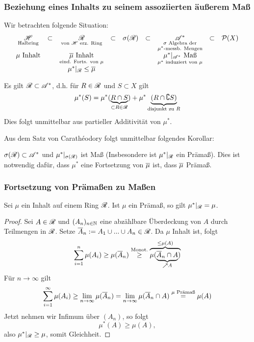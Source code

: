 \subsubsection{Beziehung eines Inhalts zu seinem assoziierten äußerem Maß}
Wir betrachten folgende Situation:
\begin{equation*}
\begin{array}{ccccccccc}
\underset{\text{Halbring}}{\mathscr{H}} & \subset & \underset{\text{von } \mathscr{H} \text{ erz. Ring}}{\mathscr{R}} & \subset &\sigma(\mathscr{R})& \subset & \underset{\substack{\sigma \text{ Algebra der} \\ \mu^*\text{-messb. Mengen}}}{\mathscr{A}^*} & \subset & \mathcal{P}(X)\\
\mu \text{ Inhalt} && \underset{\text{eind. Forts. von }\mu}{\overline\mu \text{ Inhalt}} &&&& \underset{\mu^* \text{ induziert von } \mu}{\mu^*|_{\mathscr{A}^*} \text{ Maß}} \\
&& \mu^*|_{\mathscr{R}} \leq \overline\mu
\end{array}
\end{equation*}
\begin{beobachtung}
Es gilt $\mathscr{R} \subset \mathscr{A}^*$, d.h. für $R \in \mathscr{R}$ und $S \subset X$ gilt
$$
\mu^*(S) = \mu^*(\underbrace{R \cap S}_{\subset R \in \mathscr{R}}) + \mu^* \underbrace{(R \cap \complement S)}_{\text{disjunkt zu } R}
$$
Dies folgt unmittelbar aus partieller Additivität von $\mu^*$.
\end{beobachtung}
Aus dem Satz von Carathéodory folgt unmittelbar folgendes Korollar:
\begin{korollar}
\begin{mdframed}
$\sigma(\mathscr{R}) \subset \mathscr{A}^*$ und $\mu^*|_{\sigma (\mathscr{R})}$ ist Maß (Insbesondere ist $\mu^*|_{\mathscr{R}}$ ein Prämaß). Dies ist notwendig dafür, dass $\mu^*$ eine Fortsetzung von $\overline\mu$ ist, dass $\overline\mu$ Prämaß.
\end{mdframed}
\end{korollar}

\subsubsection{Fortsetzung von Prämaßen zu Maßen}
\begin{lemma}
\begin{mdframed}
Sei $\mu$ ein Inhalt auf einem Ring $\mathscr{R}$. Ist $\mu$ ein Prämaß, so gilt $\mu^*|_{\mathscr{R}} = \mu$.
\end{mdframed}
\begin{proof}
Sei $A \in \mathscr{R}$ und $(A_n)_{n \in \mathbb{N}}$ eine abzählbare Überdeckung von $A$ durch Teilmengen in $\mathscr{R}$. Setze $\overline{A}_n:=A_1 \cup ... \cup A_n \in \mathscr{R}$. Da $\mu$ Inhalt ist, folgt
$$
\sum_{i=1}^n \mu(A_i) \geq \mu (\overline{A}_n) \overset{\text{Monot.}}\geq  \overbrace{\mu(\underbrace{\overline{A}_n \cap A}_{\nearrow A})}^{\leq \mu(A)}
$$
Für $n \longrightarrow \infty$ gilt
$$
\sum_{i=1}^\infty \mu(A_i)\geq \lim_{n \to \infty} \mu(\overline{A}_n) = \lim_{n \to \infty} \mu(\overline{A}_n \cap A) \overset{\mu \text{ Prämaß}}= \mu(A)
$$
Jetzt nehmen wir Infimum über $(A_n)$, so folgt
$$ \mu^*(A) \geq \mu(A),$$
also $\mu^*|_{\mathscr{R}} \geq \mu$, somit Gleichheit.
\end{proof}
\end{lemma}


